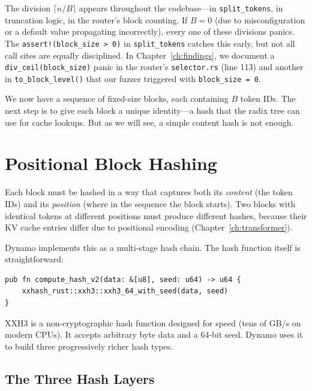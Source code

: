 \begin{notebox}
The division $\lceil n/B \rceil$ appears throughout the codebase---in \texttt{split\_tokens}, in truncation logic, in the router's block counting. If $B = 0$ (due to misconfiguration or a default value propagating incorrectly), every one of these divisions panics. The \texttt{assert!(block\_size > 0)} in \texttt{split\_tokens} catches this early, but not all call sites are equally disciplined. In Chapter~\ref{ch:findings}, we document a \texttt{div\_ceil(block\_size)} panic in the router's \texttt{selector.rs} (line 113) and another in \texttt{to\_block\_level()} that our fuzzer triggered with \texttt{block\_size = 0}.
\end{notebox}

\medskip
We now have a sequence of fixed-size blocks, each containing $B$ token IDs. The next step is to give each block a unique identity---a hash that the radix tree can use for cache lookups. But as we will see, a simple content hash is not enough.

\section{Positional Block Hashing}
\label{sec:tokens:hashing}

Each block must be hashed in a way that captures both its \emph{content} (the token IDs) and its \emph{position} (where in the sequence the block starts). Two blocks with identical tokens at different positions must produce different hashes, because their KV cache entries differ due to positional encoding (Chapter~\ref{ch:transformer}).

%
Dynamo implements this as a multi-stage hash chain. The hash function itself is straightforward:

\begin{verbatim}
pub fn compute_hash_v2(data: &[u8], seed: u64) -> u64 {
    xxhash_rust::xxh3::xxh3_64_with_seed(data, seed)
}
\end{verbatim}

XXH3 is a non-cryptographic hash function designed for speed (tens of GB/s on modern CPUs). It accepts arbitrary byte data and a 64-bit seed. Dynamo uses it to build three progressively richer hash types.

\subsection{The Three Hash Layers}

